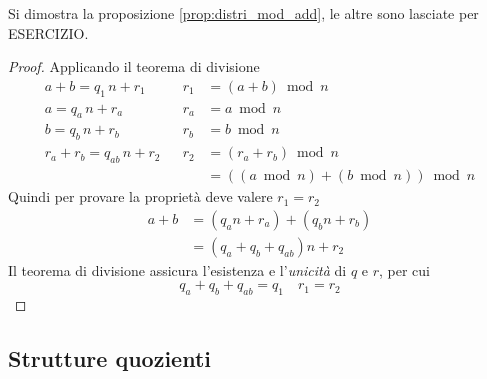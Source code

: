 Si dimostra la proposizione \ref{prop:distri_mod_add}, le altre sono lasciate per ESERCIZIO.
\begin{proof}
    Applicando il teorema di divisione
    \begin{align*}
        a + b
        = 
        q_1 \, n + r_1
        &
        &
        r_1  
        &
        =
        ( a + b )
        \bmod n 
        \\
        a
        = 
        q_a \, n + r_a
        &
        &
        r_a  
        &
        =
        a
        \bmod n 
        \\
        b
        = 
        q_b \, n + r_b
        &
        &
        r_b  
        &
        =
        b
        \bmod n 
        \\
        r_a + r_b
        = 
        q_{ab} \, n + r_2
        &
        &
        r_2  
        &
        =
        ( r_a + r_b )
        \bmod n 
        \\
        &
        &
        &
        =
        ( ( a \bmod n ) + ( b \bmod n ) ) \bmod n 
    \end{align*}
    Quindi per provare la proprietà deve valere $
    r_1 = r_2
    $
    \begin{align*}
        a + b
        &
        =
        \left( 
            q_a n + r_a
        \right)
        +
        \left( 
            q_b n + r_b
        \right)
        \\
        &
        =
        \left( 
            q_a + q_b + q_{ab}
        \right) n +
        r_2
    \end{align*}
    Il teorema di divisione assicura l'esistenza e l'\emph{unicità} di $q$ e $r$, per cui
    \begin{equation*}
        q_a + q_b + q_{ab} = q_1
        \quad
        r_1 = r_2
    \end{equation*}
\end{proof}

\subsection{Strutture quozienti}

